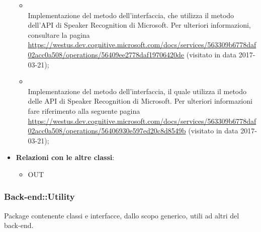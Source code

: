 \begin{itemize}
\begin{itemize}
		\item[]  \\		Implementazione del metodo dell'interfaccia, che utilizza il metodo  dell'API di Speaker Recognition di Microsoft. Per ulteriori informazioni, consultare la pagina \url{https://westus.dev.cognitive.microsoft.com/docs/services/563309b6778daf02acc0a508/operations/56409ee2778daf19706420de}  (visitato in data 2017-03-21);\\
		\item[]  \\		Implementazione del metodo dell'interfaccia, il quale utilizza il metodo  delle API di Speaker Recognition di Microsoft. Per ulteriori informazioni fare riferimento alla seguente pagina \url{https://westus.dev.cognitive.microsoft.com/docs/services/563309b6778daf02acc0a508/operations/56406930e597ed20c8d8549b}  (visitato in data 2017-03-21);\\
	\end{itemize}
	\item \textbf{Relazioni con le altre classi}:
	\begin{itemize}
		\item OUT \hyperlink{VocalLoginModuleConfig_label}{}
	\end{itemize}
\end{itemize}
\FloatBarrier

\subsubsection{Back-end::Utility}
Package contenente classi e interfacce, dallo scopo generico, utili ad altri  del back-end.
